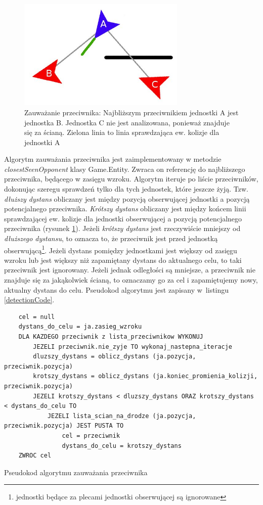 \begin{figure}
\begin{center}
	\includegraphics[width=80mm,height=53mm]{images/detection}
	\caption[Zauważanie przeciwnika]{Zauważanie przeciwnika: Najbliższym przeciwnikiem jednostki A jest jednostka B. Jednostka C nie jest analizowana, ponieważ znajduje się za ścianą. Zielona linia to linia sprawdzająca ew. kolizje dla jednostki A\label{detectionImage}}
\end{center}
\end{figure}

Algorytm zauważania przeciwnika jest zaimplementowany w metodzie \emph{closestSeenOpponent} klasy Game.Entity. Zwraca on referencję do najbliższego przeciwnika, będącego w zasięgu wzroku. Algorytm iteruje po liście przeciwników, dokonując szeregu sprawdzeń tylko dla tych jednostek, które jeszcze żyją. Tzw. \emph{dłuższy dystans} obliczany jest między pozycją obserwującej jednostki a pozycją potencjalnego przeciwnika. \emph{Krótszy dystans} obliczany jest między końcem linii sprawdzającej ew. kolizje dla jednostki obserwującej a pozycją potencjalnego przeciwnika (rysunek \ref{detectionImage}). Jeżeli \emph{krótszy dystans} jest rzeczywiście mniejszy od \emph{dłuższego dystansu}, to oznacza to, że przeciwnik jest przed jednostką obserwującą\footnote{jednostki będące za plecami jednostki obserwującej są ignorowane}. Jeżeli dystans pomiędzy jednostkami jest większy od zasięgu wzroku lub jest większy niż zapamiętany dystans do aktualnego celu, to taki przeciwnik jest ignorowany. Jeżeli jednak odległości są mniejsze, a przeciwnik nie znajduje się za jakąkolwiek ścianą, to oznaczamy go za cel i zapamiętujemy nowy, aktualny dystans do celu. Pseudokod algorytmu jest zapisany w~listingu \ref{detectionCode}.

\begin{table}
\begin{center}
\begin{lstlisting}
	cel = null
	dystans_do_celu = ja.zasieg_wzroku
	DLA KAZDEGO przeciwnik z lista_przeciwnikow WYKONUJ
		JEZELI przeciwnik.nie_zyje TO wykonaj_nastepna_iteracje
		dluzszy_dystans = oblicz_dystans (ja.pozycja, przeciwnik.pozycja)
		krotszy_dystans = oblicz_dystans (ja.koniec_promienia_kolizji, przeciwnik.pozycja)
		JEZELI krotszy_dystans < dluzszy_dystans ORAZ krotszy_dystans < dystans_do_celu TO
			JEZELI lista_scian_na_drodze (ja.pozycja, przeciwnik.pozycja) JEST PUSTA TO
				cel = przeciwnik
				dystans_do_celu = krotszy_dystans		
	ZWROC cel	
\end{lstlisting}
\caption {Pseudokod algorytmu zauważania przeciwnika}
\label{detectionCode}
\end{center}
\end{table}

